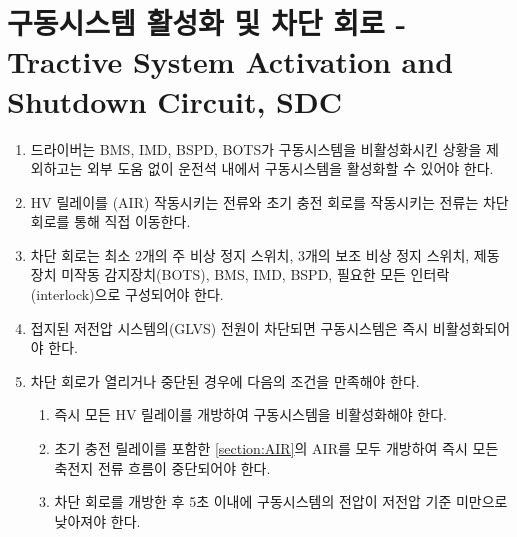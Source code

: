 \documentclass[final,a4paper,10pt]{report}
\begin{document}
\section{구동시스템 활성화 및 차단 회로 - Tractive System Activation and Shutdown Circuit, SDC}\label{rule:formula-technical.shutdown-circuit} \label{section:차단 회로}
\begin{enumerate}
  \item\label{rule:formula-technical.shutdown-circuit.driver-activation-from-cockpit} 드라이버는 BMS, IMD, BSPD, BOTS가 구동시스템을 비활성화시킨 상황을 제외하고는 외부 도움 없이 운전석 내에서 구동시스템을 활성화할 수 있어야 한다.
  \item\label{rule:formula-technical.shutdown-circuit.air-precharge-current-path} HV 릴레이를 (AIR) 작동시키는 전류와 초기 충전 회로를 작동시키는 전류는 차단 회로를 통해 직접 이동한다. \label{item:차단 회로 전류}
  \item\label{rule:formula-technical.shutdown-circuit.components} 차단 회로는 최소 2개의 주 비상 정지 스위치, 3개의 보조 비상 정지 스위치, 제동장치 미작동 감지장치(BOTS), BMS, IMD, BSPD, 필요한 모든 인터락(interlock)으로 구성되어야 한다.
  \item\label{rule:formula-technical.shutdown-circuit.disable-on-glvs-loss} 접지된 저전압 시스템의(GLVS) 전원이 차단되면 구동시스템은 즉시 비활성화되어야 한다. \label{item:구동시스템 비활성화}

  \item\label{rule:formula-technical.shutdown-circuit.sdc-open-response} 차단 회로가 열리거나 중단된 경우에 다음의 조건을 만족해야 한다. \label{item:차단 회로 작동}
    \begin{enumerate}
      \item\label{rule:formula-technical.shutdown-circuit.sdc-open-response.open-all-airs} 즉시 모든 HV 릴레이를 개방하여 구동시스템을 비활성화해야 한다.
      \item\label{rule:formula-technical.shutdown-circuit.sdc-open-response.stop-accumulator-current-flow} {\color{blue}초기 충전 릴레이를 포함한 \ref{section:AIR}의 AIR를 모두 개방하여} 즉시 모든 축전지 전류 흐름이 중단되어야 한다.
      \item\label{rule:formula-technical.shutdown-circuit.sdc-open-response.voltage-drop-within-5s} 차단 회로를 개방한 후 5초 이내에 구동시스템의 전압이 저전압 기준 미만으로 낮아져야 한다.
    \end{enumerate}


\end{enumerate}
\end{document}
